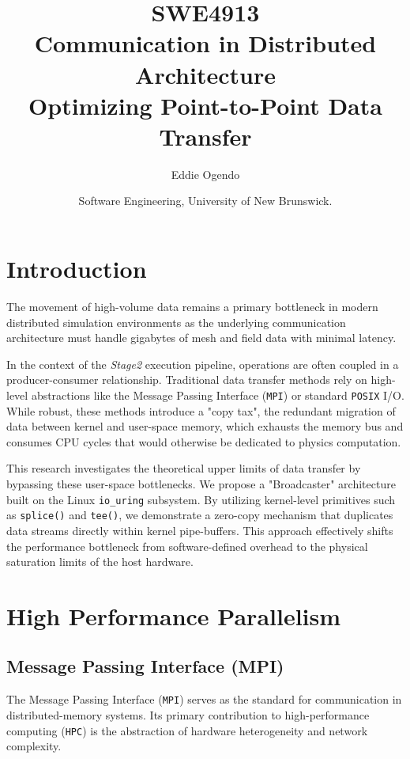 \documentclass[
	a4paper,
	10pt,
	unnumberedsections,
	twoside, 
]{LTJournalArticle}
\title{SWE4913 \\Communication in Distributed Architecture\\  Optimizing Point-to-Point Data Transfer}
\author{%
	Eddie Ogendo
}
\date{\footnotesize Software Engineering, University of New Brunswick.}
\begin{document}
\maketitle

\section{Introduction}
\label{sec:intro}

The movement of high-volume data remains a primary bottleneck in modern distributed simulation environments as the underlying communication architecture must handle gigabytes of mesh and field data with minimal latency. 

In the context of the \textit{Stage2} execution pipeline, operations are often coupled in a producer-consumer relationship. Traditional data transfer methods rely on high-level abstractions like the Message Passing Interface (\texttt{MPI}) or standard \texttt{POSIX} I/O. While robust, these methods introduce a "copy tax", the redundant migration of data between kernel and user-space memory, which exhausts the memory bus and consumes CPU cycles that would otherwise be dedicated to physics computation.

This research investigates the theoretical upper limits of data transfer by bypassing these user-space bottlenecks. We propose a "Broadcaster" architecture built on the Linux \texttt{io\_uring} subsystem. By utilizing kernel-level primitives such as \texttt{splice()} and \texttt{tee()}, we demonstrate a zero-copy mechanism that duplicates data streams directly within kernel pipe-buffers. This approach effectively shifts the performance bottleneck from software-defined overhead to the physical saturation limits of the host hardware.



\section{High Performance Parallelism}
\label{sec:hpp}
\subsection{Message Passing Interface (MPI)}
\label{sec:MPI}
The Message Passing Interface (\texttt{MPI}) serves as the standard for communication in distributed-memory systems. Its primary contribution to high-performance computing (\texttt{HPC}) is the abstraction of hardware heterogeneity and network complexity.
\end{document}
